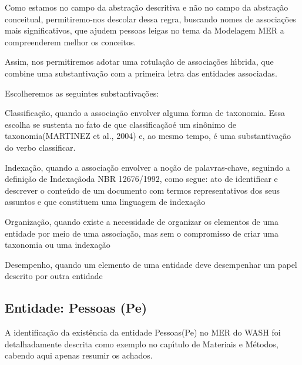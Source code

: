 \documentclass[
12pt,		%
openright,	%
twoside,  %
a4paper,			%
chapter=TITLE,		%
english,			%
french,				%
spanish,			%
brazil				%
]{USPSC-classe/USPSC}
\begin{document}
Como estamos no campo da abstra\c{c}\~ao descritiva e n\~ao no campo da abstra\c{c}\~ao conceitual, permitiremo-nos descolar dessa regra, buscando nomes de associa\c{c}\~oes mais significativos, que ajudem pessoas leigas no tema da Modelagem MER a compreenderem melhor os conceitos.









Assim, nos permitiremos adotar uma rotula\c{c}\~ao de associa\c{c}\~oes h\'{\i}brida, que combine uma substantiva\c{c}\~ao com a primeira letra das entidades associadas.









Escolheremos as seguintes substantiva\c{c}\~oes:










\begin{alineas}
\item Classifica\c{c}\~ao, quando a associa\c{c}\~ao envolver alguma forma de taxonomia. Essa escolha se sustenta no fato de que \textquotedbl classifica\c{c}\~ao\textquotedbl  \'e um sin\^onimo de \textquotedbl taxonomia\textquotedbl   (MARTINEZ et al., 2004) e, ao mesmo tempo, \'e uma substantiva\c{c}\~ao do verbo classificar.
\item Indexa\c{c}\~ao, quando a associa\c{c}\~ao envolver a no\c{c}\~ao de palavras-chave, seguindo a defini\c{c}\~ao de \textquotedbl Indexa\c{c}\~ao\textquotedbl  da NBR 12676/1992, como segue: \textquotedbl ato de identificar e descrever o conte\'udo de um documento com termos representativos dos seus assuntos e que constituem uma linguagem de indexa\c{c}\~ao\textquotedbl 
\item Organiza\c{c}\~ao, quando existe a necessidade de organizar os elementos de uma entidade por meio de uma associa\c{c}\~ao, mas sem o compromisso de criar uma taxonomia ou uma indexa\c{c}\~ao
\item Desempenho, quando um elemento de uma entidade deve desempenhar um papel descrito por outra entidade
\end{alineas}

\subsection[Entidade: Pessoas (Pe)]{Entidade: Pessoas (Pe)}\label{Entidade: Pessoas (Pe)}
A identifica\c{c}\~ao da exist\^encia da entidade \textquotedbl Pessoas\textquotedbl  (Pe) no MER do WASH foi detalhadamente descrita como exemplo no cap\'{\i}tulo de Materiais e M\'etodos, cabendo aqui apenas resumir os achados.
\end{document}
